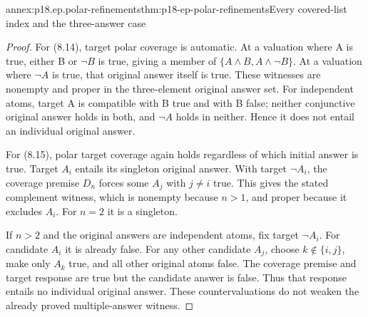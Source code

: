 \begin{annexitem}{annex:p18.ep.polar-refinements}{thm:p18-ep-polar-refinements}{Every covered-list index and the three-answer case}
\begin{proof}
For (8.14), target polar coverage is automatic. At a valuation where A
is true, either B or \(\neg B\) is true, giving a member of
\(\{A\land B,A\land\neg B\}\). At a valuation where \(\neg A\)
is true, that original answer itself is true. These witnesses are
nonempty and proper in the three-element original answer set. For
independent atoms, target A is compatible with B true and with B false;
neither conjunctive original answer holds in both, and \(\neg A\)
holds in neither. Hence it does not entail an individual original answer.

For (8.15), polar target coverage again holds regardless of which
initial answer is true. Target \(A_i\) entails its singleton original
answer. With target \(\neg A_i\), the coverage premise \(D_n\)
forces some \(A_j\) with \(j\ne i\) true. This gives the stated
complement witness, which is nonempty because \(n>1\), and proper
because it excludes \(A_i\). For \(n=2\) it is a singleton.

If \(n>2\) and the original answers are independent atoms, fix
target \(\neg A_i\). For candidate \(A_i\) it is already false.
For any other candidate \(A_j\), choose \(k\notin\{i,j\}\), make
only \(A_k\) true, and all other original atoms false. The coverage
premise and target response are true but the candidate answer is false.
Thus that response entails no individual original answer. These
countervaluations do not weaken the already proved multiple-answer witness.
\end{proof}
\end{annexitem}

